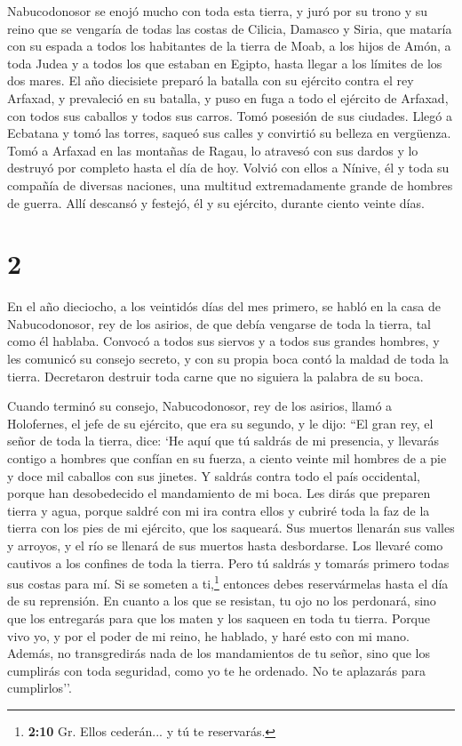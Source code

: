  Nabucodonosor se enojó mucho con toda esta tierra, y
juró por su trono y su reino que se vengaría de todas las costas de
Cilicia, Damasco y Siria, que mataría con su espada a todos los
habitantes de la tierra de Moab, a los hijos de Amón, a toda Judea y a
todos los que estaban en Egipto, hasta llegar a los límites de los dos
mares.  El año diecisiete preparó la batalla con su
ejército contra el rey Arfaxad, y prevaleció en su batalla, y puso en
fuga a todo el ejército de Arfaxad, con todos sus caballos y todos sus
carros.  Tomó posesión de sus ciudades. Llegó a Ecbatana
y tomó las torres, saqueó sus calles y convirtió su belleza en
vergüenza.  Tomó a Arfaxad en las montañas de Ragau, lo
atravesó con sus dardos y lo destruyó por completo hasta el día de hoy.
 Volvió con ellos a Nínive, él y toda su compañía de
diversas naciones, una multitud extremadamente grande de hombres de
guerra. Allí descansó y festejó, él y su ejército, durante ciento veinte
días.

\hypertarget{section-1}{%
\section{2}\label{section-1}}

 En el año dieciocho, a los veintidós días del mes
primero, se habló en la casa de Nabucodonosor, rey de los asirios, de
que debía vengarse de toda la tierra, tal como él hablaba.
 Convocó a todos sus siervos y a todos sus grandes
hombres, y les comunicó su consejo secreto, y con su propia boca contó
la maldad de toda la tierra.  Decretaron destruir toda
carne que no siguiera la palabra de su boca.

 Cuando terminó su consejo, Nabucodonosor, rey de los
asirios, llamó a Holofernes, el jefe de su ejército, que era su segundo,
y le dijo:  ``El gran rey, el señor de toda la tierra,
dice: `He aquí que tú saldrás de mi presencia, y llevarás contigo a
hombres que confían en su fuerza, a ciento veinte mil hombres de a pie y
doce mil caballos con sus jinetes.  Y saldrás contra todo
el país occidental, porque han desobedecido el mandamiento de mi boca.
 Les dirás que preparen tierra y agua, porque saldré con
mi ira contra ellos y cubriré toda la faz de la tierra con los pies de
mi ejército, que los saqueará.  Sus muertos llenarán sus
valles y arroyos, y el río se llenará de sus muertos hasta desbordarse.
 Los llevaré como cautivos a los confines de toda la
tierra.  Pero tú saldrás y tomarás primero todas sus
costas para mí. Si se someten a ti,\footnote{\textbf{2:10} Gr. Ellos
  cederán... y tú te reservarás.} entonces debes reservármelas hasta el
día de su reprensión.  En cuanto a los que se resistan,
tu ojo no los perdonará, sino que los entregarás para que los maten y
los saqueen en toda tu tierra.  Porque vivo yo, y por el
poder de mi reino, he hablado, y haré esto con mi mano. 
Además, no transgredirás nada de los mandamientos de tu señor, sino que
los cumplirás con toda seguridad, como yo te he ordenado. No te
aplazarás para cumplirlos''.

